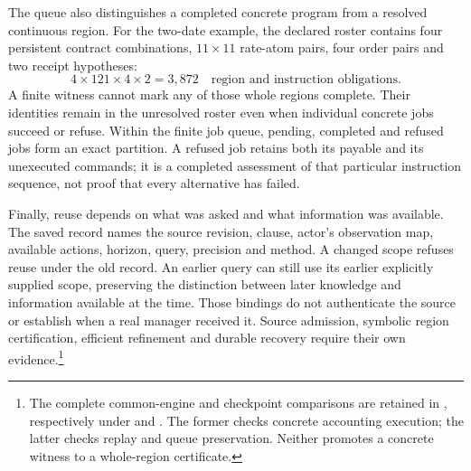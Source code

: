 The queue also distinguishes a completed concrete program from a resolved continuous region. For the two-date example, the declared roster contains four persistent contract combinations, $11\times11$ rate-atom pairs, four order pairs and two receipt hypotheses:
\begin{equation}
 4\times121\times4\times2=3{,}872
 \quad\text{region and instruction obligations}.
\end{equation}
A finite witness cannot mark any of those whole regions complete. Their identities remain in the unresolved roster even when individual concrete jobs succeed or refuse. Within the finite job queue, pending, completed and refused jobs form an exact partition. A refused job retains both its payable and its unexecuted commands; it is a completed assessment of that particular instruction sequence, not proof that every alternative has failed.

Finally, reuse depends on what was asked and what information was available. The saved record names the source revision, clause, actor's observation map, available actions, horizon, query, precision and method. A changed scope refuses reuse under the old record. An earlier query can still use its earlier explicitly supplied scope, preserving the distinction between later knowledge and information available at the time. Those bindings do not authenticate the source or establish when a real manager received it. Source admission, symbolic region certification, efficient refinement and durable recovery require their own evidence.\footnote{The complete common-engine and checkpoint comparisons are retained in , respectively under  and . The former checks concrete accounting execution; the latter checks replay and queue preservation. Neither promotes a concrete witness to a whole-region certificate.}
